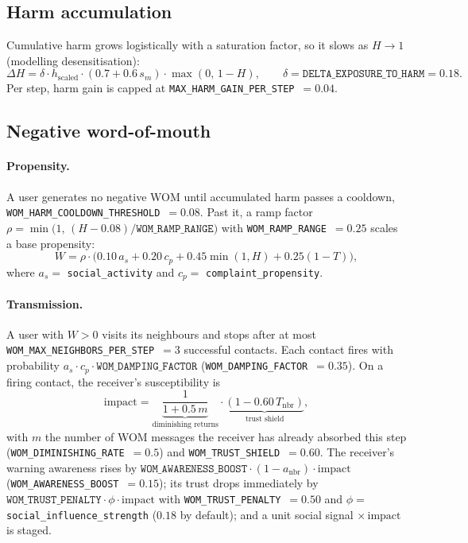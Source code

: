 \documentclass[11pt]{article}
\newcommand{\code}[1]{\texttt{#1}}
\begin{document}
\subsection{Harm accumulation}
\label{sub:harmgain}

Cumulative harm grows logistically with a saturation factor, so it slows as
$H\to1$ (modelling desensitisation):
\[
\Delta H = \delta \cdot h_{\text{scaled}} \cdot (0.7 + 0.6\,s_m)
\cdot \max(0,\,1 - H),
\qquad \delta = \code{DELTA\_EXPOSURE\_TO\_HARM} = 0.18 .
\]
Per step, harm gain is capped at \code{MAX\_HARM\_GAIN\_PER\_STEP}~$=0.04$.

\subsection{Negative word-of-mouth}
\label{sub:wom}

\paragraph{Propensity.}
A user generates no negative WOM until accumulated harm passes a cooldown,
\code{WOM\_HARM\_COOLDOWN\_THRESHOLD}~$=0.08$. Past it, a ramp factor
$\rho = \min\!\big(1,\,(H - 0.08)/\code{WOM\_RAMP\_RANGE}\big)$ with
\code{WOM\_RAMP\_RANGE}~$=0.25$ scales a base propensity:
\[
W = \rho \cdot \Big(0.10\,a_s + 0.20\,c_p + 0.45\min(1,H) + 0.25(1 - T)\Big),
\]
where $a_s = $ \code{social\_activity} and $c_p = $ \code{complaint\_propensity}.

\paragraph{Transmission.}
A user with $W>0$ visits its neighbours and stops after at most
\code{WOM\_MAX\_NEIGHBORS\_PER\_STEP}~$=3$ successful contacts. Each contact fires
with probability $a_s \cdot c_p \cdot \code{WOM\_DAMPING\_FACTOR}$
(\code{WOM\_DAMPING\_FACTOR}~$=0.35$). On a firing contact, the receiver's
susceptibility is
\[
\text{impact} = \underbrace{\frac{1}{1 + 0.5\, m}}_{\text{diminishing returns}}
\cdot \underbrace{(1 - 0.60\, T_{\text{nbr}})}_{\text{trust shield}},
\]
with $m$ the number of WOM messages the receiver has already absorbed this step
(\code{WOM\_DIMINISHING\_RATE}~$=0.5$) and \code{WOM\_TRUST\_SHIELD}~$=0.60$. The
receiver's warning awareness rises by
$\code{WOM\_AWARENESS\_BOOST}\cdot(1-a_{\text{nbr}})\cdot\text{impact}$
(\code{WOM\_AWARENESS\_BOOST}~$=0.15$); its trust drops immediately by
$\code{WOM\_TRUST\_PENALTY}\cdot \phi \cdot \text{impact}$ with
\code{WOM\_TRUST\_PENALTY}~$=0.50$ and $\phi=$ \code{social\_influence\_strength}
($0.18$ by default); and a unit social signal $\times\,\text{impact}$ is staged.
\end{document}
